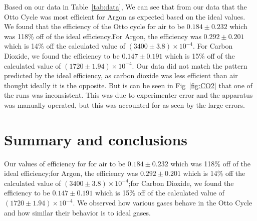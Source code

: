 \documentclass[11pt,letterpaper,onecolumn]{article}
\begin{document}
Based on our data in Table~\ref{tab:data}, We can see that from our data that the Otto Cycle was most efficient for Argon as expected based on the ideal values. We found that the efficiency of the Otto cycle for air to be $0.184\pm0.232$ which was 118\% off of the ideal efficiency.For Argon, the efficiency was $0.292\pm0.201$ which is 14\% off the calculated value of $(3400\pm3.8)\times10^{-4}$. For Carbon Dioxide, we found the efficiency to be $0.147\pm0.191$ which is 15\% off of the calculated value of $(1720\pm1.94)\times10^{-4}$. Our data did not match the pattern predicted by the ideal efficiency, as carbon dioxide was less efficient than air thought ideally it is the opposite. But is can be seen in Fig~\ref{fig:CO2} that one of the runs was inconsistent. This was due to experimenter error and the apparatus was manually operated, but this was accounted for as seen by the large errors. 


\section{Summary and conclusions}

Our values of efficiency for for air to be $0.184\pm0.232$ which was 118\% off of the ideal efficiency;for Argon, the efficiency was $0.292\pm0.201$ which is 14\% off the calculated value of $(3400\pm3.8)\times10^{-4}$;for Carbon Dioxide, we found the efficiency to be $0.147\pm0.191$ which is 15\% off of the calculated value of $(1720\pm1.94)\times10^{-4}$. We observed how various gases behave in the Otto Cycle and how similar their behavior is to ideal gases.

\end{document}
